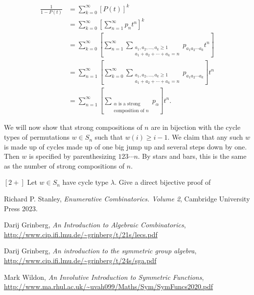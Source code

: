 \documentclass{article}
\begin{document}
\begin{align*}
    \frac{1}{1-P(t)} &= \sum_{k=0}^\infty[P(t)]^k \\
                     &= \sum_{k=0}^\infty \left[\sum_{n=1}^\infty p_nt^n\right]^k \\
                     &= \sum_{k=0}^\infty \left[\sum_{n=1}^\infty\sum_{\substack{a_1,a_2,\ldots,a_k \geq 1 \\ a_1+a_2+\cdots+a_k = n}} p_{a_1a_2\cdots a_k}t^n\right] \\
                     &= \sum_{n=1}^\infty \left[\sum_{k=0}^\infty\sum_{\substack{a_1,a_2,\ldots,a_k \geq 1 \\ a_1+a_2+\cdots+a_k = n}} p_{a_1a_2\cdots a_k}\right]t^n \\
                     &= \sum_{n=1}^\infty \left[\sum_{\substack{\alpha \text{ is a strong} \\ \text{composition of } n}}p_\alpha\right]t^n.
\end{align*}

We will now show that strong compositions of $n$ are in bijection with the cycle types of permutations $w \in S_n$ such that $w(i) \geq i-1$.
We claim that any such $w$ is made up of cycles made up of one big jump up and several steps down by one.
Then $w$ is specified by parenthesizing $123\cdots n$.
By stars and bars, this is the same as the number of strong compositions of $n$.

\begin{exercise}
    $[2+]$
    Let $w \in S_n$ have cycle type $\lambda$. Give a direct bijective proof of 
\end{exercise}

\fi 


\begin{thebibliography}{999999}
    \raggedright\footnotesize

    Richard P. Stanley, \textit{Enumerative Combinatorics. Volume 2}, Cambridge University Press 2023.

    Darij Grinberg, \textit{An Introduction to Algebraic Combinatorics}, \url{http://www.cip.ifi.lmu.de/~grinberg/t/21s/lecs.pdf}

    Darij Grinberg, \textit{An introduction to the symmetric group algebra}, \url{http://www.cip.ifi.lmu.de/~grinberg/t/24s/sga.pdf}

    Mark Wildon, \textit{An Involutive Introduction to Symmetric Functions}, \url{http://www.ma.rhul.ac.uk/~uvah099/Maths/Sym/SymFuncs2020.pdf}
\end{thebibliography}
\end{document}

